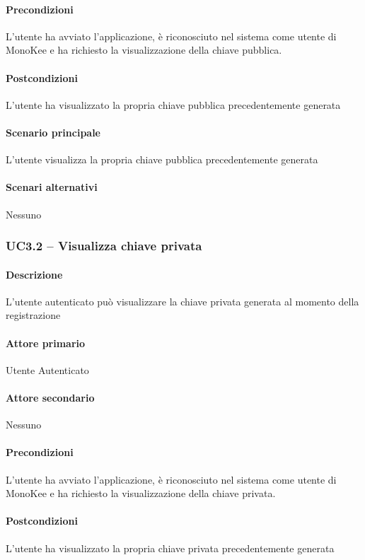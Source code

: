 \paragraph{Precondizioni}  L’utente ha avviato l’applicazione, è riconosciuto nel sistema come utente di MonoKee e ha richiesto la visualizzazione della chiave pubblica.
\paragraph{Postcondizioni}  L’utente ha visualizzato la propria chiave pubblica precedentemente generata
\paragraph{Scenario principale}  
L’utente visualizza la propria chiave pubblica precedentemente generata
\paragraph{Scenari alternativi}  Nessuno



\subsubsection{UC3.2 – Visualizza chiave privata}
\paragraph{Descrizione}  L’utente autenticato può visualizzare la chiave privata generata al momento della registrazione
\paragraph{Attore primario}  Utente Autenticato
\paragraph{Attore secondario}  Nessuno
\paragraph{Precondizioni}  L’utente ha avviato l’applicazione, è riconosciuto nel sistema come utente di MonoKee e ha richiesto la visualizzazione della chiave privata.
\paragraph{Postcondizioni}  L’utente ha visualizzato la propria chiave privata precedentemente generata
